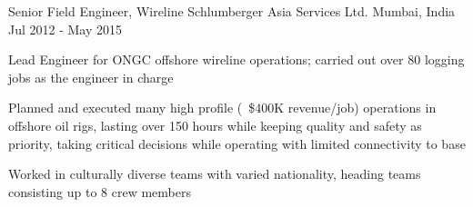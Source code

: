 \begin{cventries}
  \cventry
	{Senior Field Engineer, Wireline} %
	{Schlumberger Asia Services Ltd.} %
	{Mumbai, India} %
	{Jul 2012 - May 2015} %
	{
		\begin{cvitems} %
			\item{Lead Engineer for ONGC offshore wireline operations; carried out over 80 logging jobs as the engineer in charge}
			\item {Planned and executed many high profile (~\$400K revenue/job) operations in offshore oil rigs, lasting over 150 hours while keeping quality and safety as priority, taking critical decisions while operating with limited connectivity to base}
			\item {Worked in culturally diverse teams with varied nationality, heading teams consisting up to 8 crew members}
		\end{cvitems}
	}
\vspace{-4mm}

\end{cventries}
